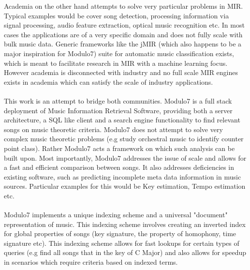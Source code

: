 Academia on the other hand attempts to solve very particular problems in MIR. Typical examples would be cover song detection\cite{coversongid}, processing information via signal processing, audio feature extraction, optical music recognition \cite{omrsurvey} etc. In most cases the applications are of a very specific domain and does not fully scale with bulk music data. Generic frameworks like the jMIR \cite{jMIR} (which also happens to be a major inspiration for Modulo7) suite for automatic music classification exists, which is meant to facilitate research in MIR with a machine learning focus. However academia is disconnected with industry and no full scale MIR engines exists in academia which can satisfy the scale of industry applications. \\\\
This work is an attempt to bridge both communities. Modulo7 is a full stack deployment of Music Information Retrieval Software, providing both a server architecture, a SQL like client and a search engine functionality to find relevant songs on music theoretic criteria. Modulo7 does not attempt to solve very complex music theoretic problems (e.g study orchestral music to identify counter point class). Rather Modulo7 acts a framework on which such analysis can be built upon. Most importantly, Modulo7 addresses the issue of scale and allows for a fast and efficient comparison between songs. It also addresses deficiencies in existing software, such as predicting incomplete meta data information in music sources. Particular examples for this would be Key estimation, Tempo estimation etc. \\\\
Modulo7 implements a unique indexing scheme and a universal "document" representation of music. This indexing scheme involves creating an inverted index for global properties of songs (key signature, the property of homophony, time signature etc). This indexing scheme allows for fast lookups for certain types of queries (e.g find all songs that in the key of C Major) and also allows for speedup in scenarios which require criteria based on indexed terms. 